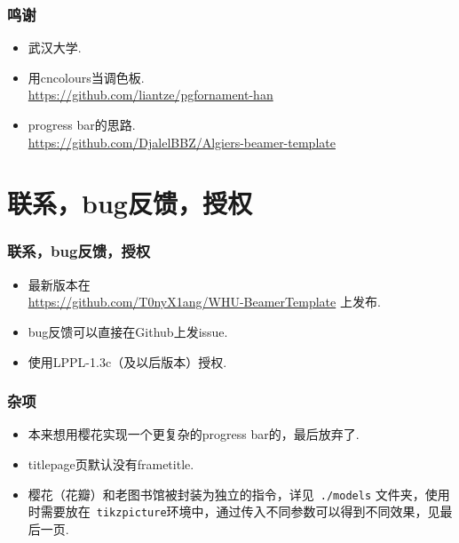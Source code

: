 \documentclass{beamer}
\begin{document}
\begin{frame}
    \frametitle{鸣谢}
    \begin{itemize}
        \item 武汉大学.
        \item 用cncolours当调色板. \\ \url{https://github.com/liantze/pgfornament-han}
        \item progress bar的思路. \\ \url{https://github.com/DjalelBBZ/Algiers-beamer-template} 
    \end{itemize}
\end{frame}

\section{联系，bug反馈，授权}
\begin{frame}
    \frametitle{联系，bug反馈，授权}
    \begin{itemize}
        \item 最新版本在 \\ \url{https://github.com/T0nyX1ang/WHU-BeamerTemplate} 上发布.
        \item bug反馈可以直接在Github上发issue.
        \item 使用LPPL-1.3c（及以后版本）授权.
    \end{itemize}
\end{frame}

\begin{frame}[fragile]
    \frametitle{杂项}
    \begin{itemize}
        \item 本来想用樱花实现一个更复杂的progress bar的，最后放弃了.
        \item titlepage页\alert{默认没有}frametitle.
        \item 樱花（花瓣）和老图书馆被封装为独立的指令，详见~\verb|./models| 文件夹，使用时需要放在~\verb|tikzpicture|环境中，通过传入不同参数可以得到不同效果，见最后一页. \hyperlink{final}{}
    \end{itemize}
\end{frame}

\begin{frame}[label=final]
\begin{figure}
    \centering
\end{figure}
\end{frame}
\end{document}
